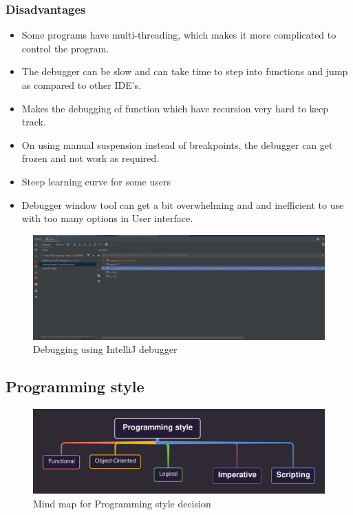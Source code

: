 \documentclass[letterpaper, 11pt]{article}
\begin{document}
    \subsubsection{\textbf{Disadvantages}}
    \begin{itemize}
        \item Some programs have multi-threading, which makes it more complicated to control the program.
        \item The debugger can be slow and can take time to step into functions and jump as compared to other IDE's.
        \item Makes the debugging of function which have recursion very hard to keep track.
        \item On using manual suspension instead of breakpoints, the debugger can get frozen and not work as required.
        \item Steep learning curve for some users
        \item Debugger window tool can get a bit overwhelming and and inefficient to use with too many options in User interface.
    \end{itemize}
    
    \begin{figure}[htb]
        \begin{center}
            \includegraphics[width=18cm]{images/debugg1.PNG}
        \end{center}
        \caption{Debugging using IntelliJ debugger}
        \label{fig:debug1}
    \end{figure}

    \subsection {Programming style}
    \begin{figure}[htb]
        \begin{center}
            \includegraphics[width=18cm]{images/mindmap_program.png}
        \end{center}
        \caption{Mind map for Programming style decision}
        \label{fig:mindmap}
    \end{figure}
    
\end{document}
